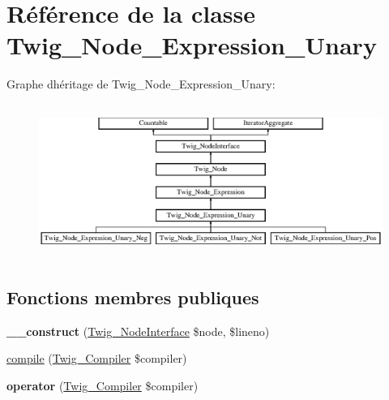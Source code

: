 \hypertarget{class_twig___node___expression___unary}{}\section{Référence de la classe Twig\+\_\+\+Node\+\_\+\+Expression\+\_\+\+Unary}
\label{class_twig___node___expression___unary}
Graphe d\textquotesingle{}héritage de Twig\+\_\+\+Node\+\_\+\+Expression\+\_\+\+Unary\+:\begin{figure}[H]
\begin{center}
\leavevmode
\includegraphics[height=5.022421cm]{class_twig___node___expression___unary}
\end{center}
\end{figure}
\subsection*{Fonctions membres publiques}
\begin{DoxyCompactItemize}
\item 
{\bfseries \+\_\+\+\_\+construct} (\hyperlink{interface_twig___node_interface}{Twig\+\_\+\+Node\+Interface} \$node, \$lineno)\hypertarget{class_twig___node___expression___unary_a830fcaf963f7198fdebdcad4907c42ab}{}\label{class_twig___node___expression___unary_a830fcaf963f7198fdebdcad4907c42ab}

\item 
\hyperlink{class_twig___node___expression___unary_a4e0faa87c3fae583620b84d3607085da}{compile} (\hyperlink{class_twig___compiler}{Twig\+\_\+\+Compiler} \$compiler)
\item 
{\bfseries operator} (\hyperlink{class_twig___compiler}{Twig\+\_\+\+Compiler} \$compiler)\hypertarget{class_twig___node___expression___unary_af77318ec88d5f8a508684970a150b670}{}\label{class_twig___node___expression___unary_af77318ec88d5f8a508684970a150b670}

\end{DoxyCompactItemize}

